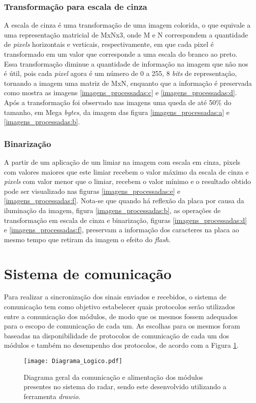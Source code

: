 \subsubsection{Transformação para escala de cinza}
A escala de cinza é uma transformação de uma imagem colorida, o que equivale a uma representação matricial de MxNx3, onde M e N correspondem a quantidade de \emph{pixels} horizontais e verticais, respectivamente, em que cada pixel é transformado em um valor que corresponde a uma escala do branco ao preto. Essa transformação diminue a quantidade de informação na imagem que não nos é útil, pois cada \emph{pixel} agora é um número de 0 a 255, 8 \emph{bits} de representação, tornando a imagem uma matriz de MxN, enquanto que a informação é preservada como mostra as imagens \ref{imagens_processadas:c} e \ref{imagens_processadas:d}. Após a transformação foi observado nas imagens uma queda de até 50\% do tamanho, em Mega \emph{bytes}, da imagem das figura \ref{imagens_processadas:a} e \ref{imagens_processadas:b}.
\subsubsection{Binarização}
A partir de um aplicação de um limiar na imagem com escala em cinza, pixels com valores maiores que este limiar recebem o valor máximo da escala de cinza e \emph{pixels} com valor menor que o limiar, recebem o valor mínimo e o resultado obtido  pode ser visualizado nas figuras \ref{imagens_processadas:e} e \ref{imagens_processadas:f}.
Nota-se que quando há reflexão da placa por causa da iluminação da imagem, figura \ref{imagens_processadas:b}, as operações de transformação em escala de cinza e binarização, figuras \ref{imagens_processadas:d} e \ref{imagens_processadas:f}, preservam a informação dos caracteres na placa ao mesmo tempo que retiram da imagem o efeito do \emph{flash}.
\section{Sistema de comunicação}
Para realizar a sincronização dos sinais enviados e recebidos, o sistema de comunicação tem como objetivo estabelecer quais protocolos serão utilizados entre a comunicação dos módulos, de modo que os mesmos fossem adequados para o escopo de comunicação de cada um.
As escolhas para os mesmos foram baseadas na disponibilidade de protocolos  de comunicação de cada um dos módulos e também no desempenho dos protocolos, de acordo com a Figura \ref{diagrama_logico}.
\begin{figure}[H]
    \centering
    \texttt{[image: Diagrama\_Logico.pdf]}
    \caption{Diagrama geral da comunicação e alimentação dos módulos presentes no sistema do radar, sendo este desenvolvido utilizando a ferramenta \emph{drawio}. }
    \label{diagrama_logico}
\end{figure}
